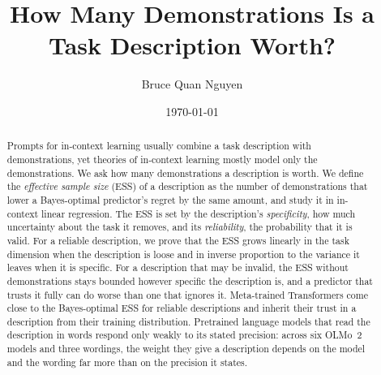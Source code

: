 \documentclass[10pt]{article}
\title{How Many Demonstrations Is a Task Description Worth?}
\author{Bruce Quan Nguyen}
\date{\today}
\begin{document}
\maketitle

\begin{abstract}
Prompts for in-context learning usually combine a task description with demonstrations, yet theories of in-context learning mostly model only the demonstrations. We ask how many demonstrations a description is worth. We define the \emph{effective sample size} (ESS) of a description as the number of demonstrations that lower a Bayes-optimal predictor's regret by the same amount, and study it in in-context linear regression. The ESS is set by the description's \emph{specificity}, how much uncertainty about the task it removes, and its \emph{reliability}, the probability that it is valid. For a reliable description, we prove that the ESS grows linearly in the task dimension when the description is loose and in inverse proportion to the variance it leaves when it is specific. For a description that may be invalid, the ESS without demonstrations stays bounded however specific the description is, and a predictor that trusts it fully can do worse than one that ignores it. Meta-trained Transformers come close to the Bayes-optimal ESS for reliable descriptions and inherit their trust in a description from their training distribution. Pretrained language models that read the description in words respond only weakly to its stated precision: across six OLMo~2 models and three wordings, the weight they give a description depends on the model and the wording far more than on the precision it states.
\end{abstract}
\end{document}
